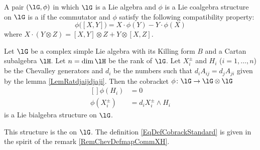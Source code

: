 \begin{definition}
    A pair \( (\lG,\phi)\) in which \( \lG\) is a Lie algebra and \( \phi\) is a Lie coalgebra structure on \( \lG\) is a  if the commutator and \( \phi\) satisfy the following compatibility property:
    \begin{equation}
        \phi\big( [X,Y] \big)=X\cdot\phi(Y)-Y\cdot\phi(X)
    \end{equation}
    where $X\cdot(Y\otimes Z)=[X,Y]\otimes Z+Y\otimes[X,Z]$.
\end{definition}

\begin{proposition}     \label{PropStandardBialgStruct} 
    Let \( \lG\) be a complex simple Lie algebra with its Killing form \( B\) and a Cartan subalgebra \( \lH\). Let \( n=\dim\lH\) be the rank of \( \lG\). Let \( X_i^{\pm}\) and \( H_i\) (\( i=1,\ldots,n\)) be the Chevalley generators and \( d_i\) be the numbers such that \( d_iA_{ij}=d_jA_{ji}\) given by the lemma \ref{LemRatdjaijdjaji}. Then the cobracket \( \phi\colon \lG\to \lG\otimes\lG\)
    \begin{equation}        \label{EqDefCobrackStandard}
        \begin{aligned}[]
            \phi(H_i)&=0\\
            \phi(X_i^{\pm})&=d_iX_i^{\pm}\wedge H_i
        \end{aligned}
    \end{equation}
    is a Lie bialgebra structure on \( \lG\).
\end{proposition}
This structure is the  on \( \lG\). The definition \eqref{EqDefCobrackStandard} is given in the spirit of the remark \ref{RemChevDefmapCommXH}.

